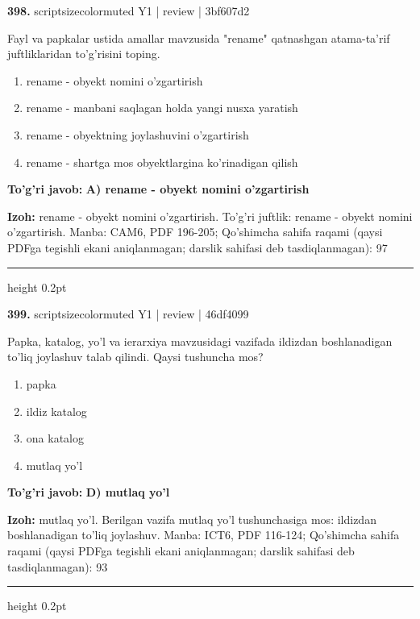 \documentclass[10pt,a4paper]{article}
\begin{document}
{\bfseries\sffamily\color{ink} 398.} {scriptsizecolor{muted} Y1 | review | 3bf607d2}
\par
Fayl va papkalar ustida amallar mavzusida "rename" qatnashgan atama-ta'rif juftliklaridan to'g'risini toping.
\begin{enumerate}[label=\Alph*),leftmargin=9mm]
\item rename - obyekt nomini o'zgartirish
\item rename - manbani saqlagan holda yangi nusxa yaratish
\item rename - obyektning joylashuvini o'zgartirish
\item rename - shartga mos obyektlargina ko'rinadigan qilish
\end{enumerate}
\begin{tcolorbox}[enhanced,breakable,colback=teal!4,colframe=teal!60!black,boxrule=0.45pt,arc=1.2mm,left=2.7mm,right=2.7mm,top=1.8mm,bottom=1.8mm,before skip=2mm,after skip=2mm]
{\bfseries\sffamily\color{teal}To'g'ri javob:} \textbf{A) rename - obyekt nomini o'zgartirish}
\par\smallskip
{\bfseries Izoh:} rename - obyekt nomini o'zgartirish. To'g'ri juftlik: rename - obyekt nomini o'zgartirish. Manba: CAM6, PDF 196-205; Qo'shimcha sahifa raqami (qaysi PDFga tegishli ekani aniqlanmagan; darslik sahifasi deb tasdiqlanmagan): 97
\end{tcolorbox}
\vspace{2mm}\hrule height 0.2pt\vspace{3mm}

{\bfseries\sffamily\color{ink} 399.} {scriptsizecolor{muted} Y1 | review | 46df4099}
\par
Papka, katalog, yo'l va ierarxiya mavzusidagi vazifada ildizdan boshlanadigan to'liq joylashuv talab qilindi. Qaysi tushuncha mos?
\begin{enumerate}[label=\Alph*),leftmargin=9mm]
\item papka
\item ildiz katalog
\item ona katalog
\item mutlaq yo'l
\end{enumerate}
\begin{tcolorbox}[enhanced,breakable,colback=teal!4,colframe=teal!60!black,boxrule=0.45pt,arc=1.2mm,left=2.7mm,right=2.7mm,top=1.8mm,bottom=1.8mm,before skip=2mm,after skip=2mm]
{\bfseries\sffamily\color{teal}To'g'ri javob:} \textbf{D) mutlaq yo'l}
\par\smallskip
{\bfseries Izoh:} mutlaq yo'l. Berilgan vazifa mutlaq yo'l tushunchasiga mos: ildizdan boshlanadigan to'liq joylashuv. Manba: ICT6, PDF 116-124; Qo'shimcha sahifa raqami (qaysi PDFga tegishli ekani aniqlanmagan; darslik sahifasi deb tasdiqlanmagan): 93
\end{tcolorbox}
\vspace{2mm}\hrule height 0.2pt\vspace{3mm}
\end{document}
